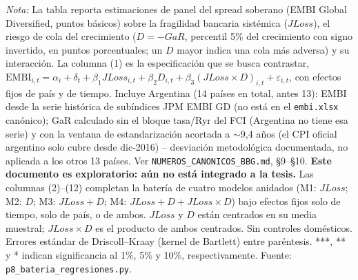 \documentclass[11pt]{article}
\begin{document}
\begin{landscape}
\begin{table}
\par\smallskip\parbox{\linewidth}{\scriptsize \textit{Nota:} La tabla reporta estimaciones de panel del spread soberano (EMBI Global Diversified, puntos básicos) sobre la fragilidad bancaria sistémica ($JLoss$), el riesgo de cola del crecimiento ($D=-GaR$, percentil 5\% del crecimiento con signo invertido, en puntos porcentuales; un $D$ mayor indica una cola más adversa) y su interacción. La columna (1) es la especificación que se busca contrastar, $\mathrm{EMBI}_{i,t}=\alpha_i+\delta_t+\beta_1 JLoss_{i,t}+\beta_2 D_{i,t}+\beta_3(JLoss\times D)_{i,t}+\varepsilon_{i,t}$, con efectos fijos de país y de tiempo. Incluye Argentina (14 países en total, antes 13): EMBI desde la serie histórica de subíndices JPM EMBI GD (no está en el \texttt{embi.xlsx} canónico); GaR calculado sin el bloque tasa/Ryr del FCI (Argentina no tiene esa serie) y con la ventana de estandarización acortada a $\sim$9,4 años (el CPI oficial argentino solo cubre desde dic-2016) -- desviación metodológica documentada, no aplicada a los otros 13 países. Ver \texttt{NUMEROS\_CANONICOS\_BBG.md}, \S9--\S10. \textbf{Este documento es exploratorio: aún no está integrado a la tesis.} Las columnas (2)--(12) completan la batería de cuatro modelos anidados (M1: $JLoss$; M2: $D$; M3: $JLoss+D$; M4: $JLoss+D+JLoss\times D$) bajo efectos fijos solo de tiempo, solo de país, o de ambos. $JLoss$ y $D$ están centrados en su media muestral; $JLoss\times D$ es el producto de ambos centrados. Sin controles domésticos. Errores estándar de Driscoll--Kraay (kernel de Bartlett) entre paréntesis. ***, ** y * indican significancia al 1\%, 5\% y 10\%, respectivamente. Fuente: \texttt{p8\_bateria\_regresiones.py}.}
\end{table}
\end{landscape}

\clearpage
\end{document}
